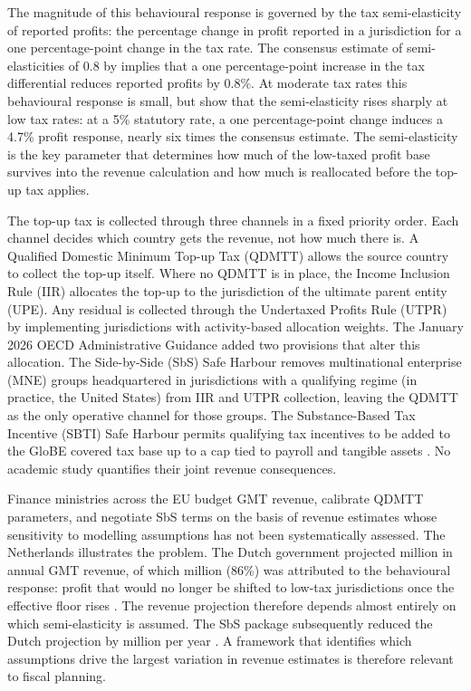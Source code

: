 \documentclass[11pt,a4paper]{article}
\newcommand{\EUR}{\texteuro}
\begin{document}
The magnitude of this behavioural response is governed by the tax semi-elasticity of reported profits: the percentage change in profit reported in a jurisdiction for a one percentage-point change in the tax rate. The consensus estimate of semi-elasticities of 0.8 by \citet{heckemeyer2017} implies that a one percentage-point increase in the tax differential reduces reported profits by 0.8\%. At moderate tax rates this behavioural response is small, but \citet{dowd2017} show that the semi-elasticity rises sharply at low tax rates: at a 5\% statutory rate, a one percentage-point change induces a 4.7\% profit response, nearly six times the consensus estimate. The semi-elasticity is the key parameter that determines how much of the low-taxed profit base survives into the revenue calculation and how much is reallocated before the top-up tax applies.

The top-up tax is collected through three channels in a fixed priority order. Each channel decides which country gets the revenue, not how much there is. A Qualified Domestic Minimum Top-up Tax (QDMTT) allows the source country to collect the top-up itself. Where no QDMTT is in place, the Income Inclusion Rule (IIR) allocates the top-up to the jurisdiction of the ultimate parent entity (UPE). Any residual is collected through the Undertaxed Profits Rule (UTPR) by implementing jurisdictions with activity-based allocation weights. The January 2026 OECD Administrative Guidance added two provisions that alter this allocation. The Side-by-Side (SbS) Safe Harbour removes multinational enterprise (MNE) groups headquartered in jurisdictions with a qualifying regime (in practice, the United States) from IIR and UTPR collection, leaving the QDMTT as the only operative channel for those groups. The Substance-Based Tax Incentive (SBTI) Safe Harbour permits qualifying tax incentives to be added to the GloBE covered tax base up to a cap tied to payroll and tangible assets \citep{oecd2026}. No academic study quantifies their joint revenue consequences.

Finance ministries across the EU budget GMT revenue, calibrate QDMTT parameters, and negotiate SbS terms on the basis of revenue estimates whose sensitivity to modelling assumptions has not been systematically assessed. The Netherlands illustrates the problem. The Dutch government projected \EUR466 million in annual GMT revenue, of which \EUR402 million (86\%) was attributed to the behavioural response: profit that would no longer be shifted to low-tax jurisdictions once the effective floor rises \citep{36369_3}. The revenue projection therefore depends almost entirely on which semi-elasticity is assumed. The SbS package subsequently reduced the Dutch projection by \EUR120 million per year \citep{1028}. A framework that identifies which assumptions drive the largest variation in revenue estimates is therefore relevant to fiscal planning.
\end{document}
